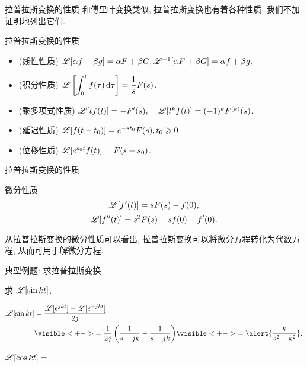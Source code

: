 \begin{frame}{拉普拉斯变换的性质}
	\onslide<+->
	和傅里叶变换类似, 拉普拉斯变换也有着各种性质. 我们不加证明地列出它们.

	\onslide<+->
	\begin{block}{拉普拉斯变换的性质}
		\begin{itemize}
			\item (线性性质) $\mathscr{L}[\alpha f+\beta g]=\alpha F+\beta G, \mathscr{L}^{-1}[\alpha F+\beta G]=\alpha f+\beta g$.
			\item (积分性质) $\displaystyle\mathscr{L}\left[\int_0^t f(\tau)\,\mathrm{d}\tau\right]=\frac 1s F(s)$.
			\item (乘多项式性质) $\mathscr{L}[tf(t)]=-F'(s),\quad\mathscr{L}[t^kf(t)]=(-1)^kF^{(k)}(s)$.
			\item (延迟性质) $\mathscr{L}[f(t-t_0)]=e^{-st_0}F(s), t_0\geqslant 0$.
			\item (位移性质) $\mathscr{L}[e^{s_0t}f(t)]=F(s-s_0)$.
		\end{itemize}
	\end{block}
\end{frame}


\begin{frame}{拉普拉斯变换的性质}
	\onslide<+->
	\begin{alertblock}{微分性质}
		\[\mathscr{L}[f'(t)]=sF(s)-f(0),\]
		\[\mathscr{L}[f''(t)]=s^2F(s)-sf(0)-f'(0).\]
	\end{alertblock}

	\onslide<+->
	从拉普拉斯变换的微分性质可以看出, 拉普拉斯变换可以将微分方程转化为代数方程, 从而可用于解微分方程.
\end{frame}


\begin{frame}{典型例题: 求拉普拉斯变换}
	\onslide<+->
	\begin{example}
		求 $\mathscr{L}[\sin{kt}]$.
	\end{example}

	\onslide<+->
	\begin{solution}
		\begin{align*}
			\msl[\sin{kt}]&=\frac{\msl[e^{jkt}]-\msl[e^{-jkt}]}{2j}\\
			&\visible<+->{=\frac1{2j}\left(\frac1{s-jk}-\frac1{s+jk}\right)}
			\visible<+->{=\alert{\frac k{s^2+k^2}}.}
		\end{align*}
	\end{solution}

	\onslide<+->
	\begin{exercise}
		$\mathscr{L}[\cos{kt}]=$.
	\end{exercise}
\end{frame}


